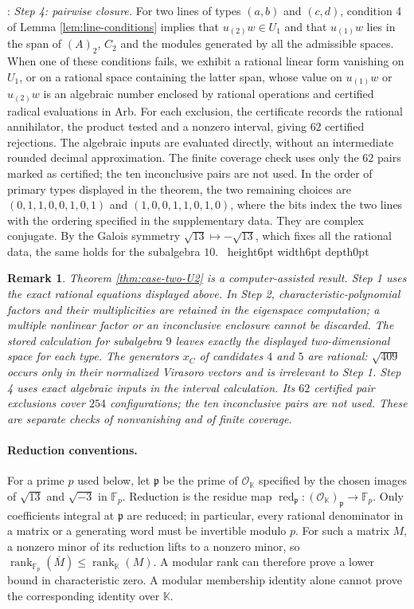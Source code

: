 \documentclass[leqno]{article}
\newcommand{\K}{\ensuremath{\mathbb{K}}}
\renewcommand{\leq}{\ensuremath{\leqslant}}
\newcommand{\qed}{\hfill \vrule height6pt  width6pt depth0pt}
\newcommand{\co}{\colon}
\newtheorem{remark}[thm]{Remark}
\newenvironment{proof}[1][]{\noindent {\it Proof #1} : }{\hbox{~}\qed
\smallskip
}
\numberwithin{equation}{section}
\begin{document}
\begin{proof}
\emph{Step 4: pairwise closure.} For two lines of types $(a,b)$ and $(c,d)$, condition 4 of Lemma \ref{lem:line-conditions} implies that $u_{(2)}w \in U_1$ and that $u_{(1)}w$ lies in the span of $(A)_2$, $C_2$ and the modules generated by all the admissible spaces. When one of these conditions fails, we exhibit a rational linear form vanishing on $U_1$, or on a rational space containing the latter span, whose value on $u_{(1)}w$ or $u_{(2)}w$ is an algebraic number enclosed by rational operations and certified radical evaluations in Arb. For each exclusion, the certificate records the rational annihilator, the product tested and a nonzero interval, giving $62$ certified rejections. The algebraic inputs are evaluated directly, without an intermediate rounded decimal approximation. The finite coverage check uses only the $62$ pairs marked as certified; the ten inconclusive pairs are not used. In the order of primary types displayed in the theorem, the two remaining choices are $(0,1,1,0,0,1,0,1)$ and $(1,0,0,1,1,0,1,0)$, where the bits index the two lines with the ordering specified in the supplementary data. They are complex conjugate. By the Galois symmetry $\sqrt{13} \mapsto -\sqrt{13}$, which fixes all the rational data, the same holds for the subalgebra $10$.
\end{proof}

\begin{remark}\normalfont
\label{rem:case-two-status}
Theorem \ref{thm:case-two-U2} is a computer-assisted result. Step 1 uses the exact rational equations displayed above. In Step 2, characteristic-polynomial factors and their multiplicities are retained in the eigenspace computation; a multiple nonlinear factor or an inconclusive enclosure cannot be discarded. The stored calculation for subalgebra $9$ leaves exactly the displayed two-dimensional space for each type. The generators $x_C$ of candidates $4$ and $5$ are rational: $\sqrt{409}$ occurs only in their normalized Virasoro vectors and is irrelevant to Step 1. Step 4 uses exact algebraic inputs in the interval calculation. Its $62$ certified pair exclusions cover $254$ configurations; the ten inconclusive pairs are not used. These are separate checks of nonvanishing and of finite coverage.
\end{remark}

\paragraph{Reduction conventions.}
For a prime $p$ used below, let $\mathfrak p$ be the prime of $\mathcal O_{\K}$ specified by the chosen images of $\sqrt{13}$ and $\sqrt{-3}$ in $\mathbb F_p$. Reduction is the residue map $\operatorname{red}_{\mathfrak p} \co (\mathcal O_{\K})_{\mathfrak p} \to \mathbb F_p$. Only coefficients integral at $\mathfrak p$ are reduced; in particular, every rational denominator in a matrix or a generating word must be invertible modulo $p$. For such a matrix $M$, a nonzero minor of its reduction lifts to a nonzero minor, so $\operatorname{rank}_{\mathbb F_p}(\overline M) \leq \operatorname{rank}_{\K}(M)$. A modular rank can therefore prove a lower bound in characteristic zero. A modular membership identity alone cannot prove the corresponding identity over $\K$.
\end{document}
